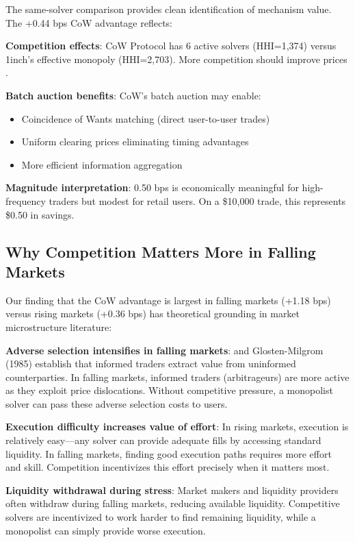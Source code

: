 \documentclass[12pt,a4paper]{article}
\begin{document}
The same-solver comparison provides clean identification of mechanism value. The +0.44 bps CoW advantage reflects:

\textbf{Competition effects}: CoW Protocol has 6 active solvers (HHI=1,374) versus 1inch's effective monopoly (HHI=2,703). More competition should improve prices \citep{kyle1985}.

\textbf{Batch auction benefits}: CoW's batch auction may enable:
\begin{itemize}
    \item Coincidence of Wants matching (direct user-to-user trades)
    \item Uniform clearing prices eliminating timing advantages
    \item More efficient information aggregation
\end{itemize}

\textbf{Magnitude interpretation}: 0.50 bps is economically meaningful for high-frequency traders but modest for retail users. On a \$10,000 trade, this represents \$0.50 in savings.

\subsection{Why Competition Matters More in Falling Markets}

Our finding that the CoW advantage is largest in falling markets (+1.18 bps) versus rising markets (+0.36 bps) has theoretical grounding in market microstructure literature:

\textbf{Adverse selection intensifies in falling markets}: \cite{kyle1985} and Glosten-Milgrom (1985) establish that informed traders extract value from uninformed counterparties. In falling markets, informed traders (arbitrageurs) are more active as they exploit price dislocations. Without competitive pressure, a monopolist solver can pass these adverse selection costs to users.

\textbf{Execution difficulty increases value of effort}: In rising markets, execution is relatively easy---any solver can provide adequate fills by accessing standard liquidity. In falling markets, finding good execution paths requires more effort and skill. Competition incentivizes this effort precisely when it matters most.

\textbf{Liquidity withdrawal during stress}: Market makers and liquidity providers often withdraw during falling markets, reducing available liquidity. Competitive solvers are incentivized to work harder to find remaining liquidity, while a monopolist can simply provide worse execution.
\end{document}
